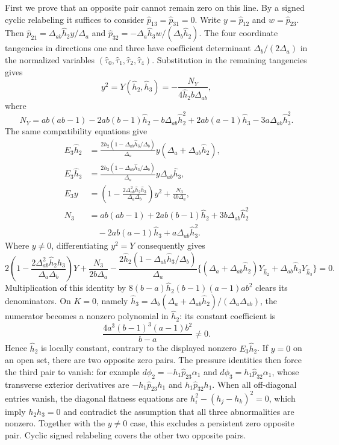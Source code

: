 \documentclass[11pt,a4paper]{article}
\numberwithin{equation}{section}
\theoremstyle{plain}
\theoremstyle{definition}
\theoremstyle{remark}
\begin{document}
First we prove that an opposite pair cannot remain zero on this line.
By a signed cyclic relabeling it suffices to consider $\widehat p_{13}=\widehat p_{31}=0$.
Write $y=\widehat p_{12}$ and $w=\widehat p_{23}$. Then
$\widehat p_{21}=\Delta_{ab}\widehat h_2 y/\Delta_a$ and $\widehat p_{32}=-\Delta_a\widehat h_3 w/(\Delta_b\widehat h_2 )$.
The four coordinate tangencies in directions one and three have
coefficient determinant $\Delta_b/(2\Delta_a)$ in the normalized variables
$(\widehat\tau_0,\widehat\tau_1,\widehat\tau_2,\widehat\tau_4)$. Substitution in the remaining tangencies gives
\[
 y^2=Y(\widehat h_2 ,\widehat h_3 )=-\frac{N_Y}{4\widehat h_2 b\Delta_{ab}},
\]
where
\[
 N_Y=ab(ab-1)-2ab(b-1)\widehat h_2 -b\Delta_{ab}\widehat h_2 ^2
             +2ab(a-1)\widehat h_3 -3a\Delta_{ab}\widehat h_3 ^2.
\]
The same compatibility equations give
\begin{align*}
 E_3\widehat h_2 &=\frac{2\widehat h_2 (1-\Delta_{ab}\widehat h_3/\Delta_b)}{\Delta_a}y(\Delta_a+\Delta_{ab}\widehat h_2 ),\\
 E_3\widehat h_3 &=\frac{2\widehat h_2 (1-\Delta_{ab}\widehat h_3/\Delta_b)}{\Delta_a}y\Delta_{ab}\widehat h_3 ,\\
 E_3y&=\left(1-\frac{2\Delta_{ab}^2\widehat h_2 \widehat h_3 }{\Delta_a\Delta_b}\right)y^2
                    +\frac{N_3}{4b\Delta_a},\\
 N_3&=ab(ab-1)+2ab(b-1)\widehat h_2 +3b\Delta_{ab}\widehat h_2 ^2\\
 &\quad-2ab(a-1)\widehat h_3 +a\Delta_{ab}\widehat h_3 ^2 .
\end{align*}
Where $y\ne0$, differentiating $y^2=Y$ consequently gives
\[
 2\left(1-\frac{2\Delta_{ab}^2\widehat h_2 \widehat h_3 }{\Delta_a\Delta_b}\right)Y+\frac{N_3}{2b\Delta_a}
 -\frac{2\widehat h_2 (1-\Delta_{ab}\widehat h_3/\Delta_b)}{\Delta_a}\{(\Delta_a+\Delta_{ab}\widehat h_2 )Y_{\widehat h_2} +\Delta_{ab}\widehat h_3 Y_{\widehat h_3} \}=0.
\]
Multiplication of this identity by $8(b-a)\widehat h_2(b-1)(a-1)ab^2$ clears its denominators.
On $K=0$, namely $\widehat h_3 =\Delta_b(\Delta_a+\Delta_{ab}\widehat h_2 )/(\Delta_a\Delta_{ab})$, the numerator becomes
a nonzero polynomial in $\widehat h_2 $: its constant coefficient is
\[
          \frac{4a^3(b-1)^3(a-1)b^2}{b-a}\ne0 .
\]
Hence $\widehat h_2 $ is locally constant, contrary to the displayed nonzero
$E_3\widehat h_2 $. If $y=0$ on an open set, there are two opposite zero pairs.
The pressure identities then force the third pair to vanish:
for example $d\phi_2=-h_1  \widehat p_{23}\alpha_1$ and
$d\phi_3=h_1  \widehat p_{32}\alpha_1$, whose transverse exterior derivatives are
$-h_1  \widehat p_{23}h_1$ and $h_1  \widehat p_{32}h_1$. When all off-diagonal entries vanish,
the diagonal flatness equations are
$h_i^2-(h_j-h_k)^2=0$, which imply $h_2h_3=0$ and contradict the assumption that all three abnormalities are nonzero. Together with the $y\ne0$ case, this excludes a persistent zero opposite pair. Cyclic signed relabeling covers the other two
opposite pairs.
\end{document}
